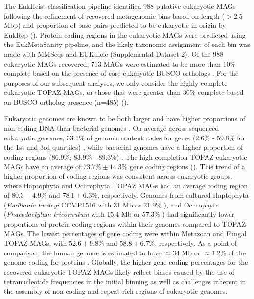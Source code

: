 \documentclass[12pt]{article}
\numberwithin{equation}{section}
\begin{document}
The EukHeist classification pipeline identified 988 putative eukaryotic MAGs following the refinement of recovered metagenomic bins based on length ($>2.5$ Mbp) and proportion of base pairs predicted to be eukaryotic in origin by EukRep \citep{West2018Genome-reconstruction} (). Protein coding regions in the eukaryotic MAGs were predicted using the EukMetaSanity pipeline, and the likely taxonomic assignment of each bin was made with MMSeqs  \citep{Steinegger2018} and EUKulele \citep{Krinos2021EUKulele} (Supplemental Dataset 2). Of the 988 eukaryotic MAGs recovered, 713 MAGs were estimated to be more than 10\% complete based on the presence of core eukaryotic BUSCO orthologs \citep{Simao2015BUSCO}. For the purposes of our subsequent analyses, we only consider the highly complete eukaryotic TOPAZ MAGs, or those that were greater than 30\% complete based on BUSCO ortholog presence (n=485) (). 

Eukaryotic genomes are known to be both larger and have higher proportions of non-coding DNA than bacterial genomes \citep{Zhang2011practical}. On average across sequenced eukaryotic genomes, 33.1\% of genomic content codes for genes (2.6\% - 59.8\% for the 1st and 3rd quartiles) \citep{Hou_2009}, while bacterial genomes have a higher proportion of coding regions (86.9\%; 83.9\% - 89.3\%) \citep{Hou_2009}. The high-completion TOPAZ eukaryotic MAGs have an average of $73.7\% \pm 14.3\%$ gene coding regions (). This trend of a higher proportion of coding regions was consistent across eukaryotic groups, where Haptophyta and Ochrophyta TOPAZ MAGs had an average coding region of $80.3 \pm 4.9\%$ and $78.1 \pm 6.3\%$, respectively. Genomes from cultured Haptophyta (\textit{Emiliania huxleyi} CCMP1516 with 31 Mb or 21.9\% \citep{Read2013}), and Ochrophyta (\textit{Phaeodactylum tricornutum} with 15.4 Mb or 57.3\% \citep{Bowler_2008}) had significantly lower proportions of protein coding regions within their genomes compared to TOPAZ MAGs. The lowest percentages of gene coding were within Metazoan and Fungal TOPAZ MAGs, with $52.6\pm 9.8\%$ and  $58.8 \pm 6.7\%$, respectively. As a point of comparison, the human genome is estimated to have $\approx 34$ Mb or $\approx 1.2$\% of the  genome coding for proteins \citep{humangenome}. Globally, the higher gene coding percentages for the recovered eukaryotic TOPAZ MAGs likely reflect biases caused by the use of tetranucleotide frequencies in the initial binning \citep{Kang_2019} as well as challenges inherent in the assembly of non-coding and repeat-rich regions of eukaryotic genomes. 
\end{document}
